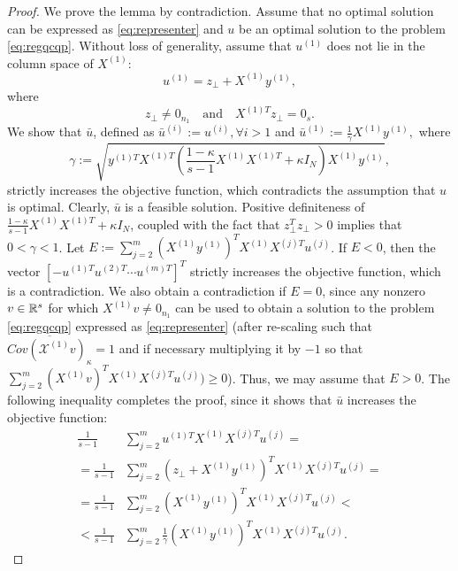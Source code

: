 \begin{proof}
We prove the lemma by contradiction. Assume that no optimal solution
can be expressed as \eqref{eq:representer} and $u$ be an optimal solution to the problem \eqref{eq:regqcqp}. Without loss of generality, assume that $u^{(1)}$ does not lie in the column space of $X^{(1)}$:
 $$u^{(1)} = z_{\bot} + X^{(1)} y^{(1)},$$
 where
$$z_{\bot} \neq 0_{n_1}\quad \text{and}\quad X^{(1)T}z_{\bot} = 0_s.$$
We show that $\bar{u}$, defined as $\bar{u}^{(i)} := u^{(i)}, \forall i> 1$ and $\bar{u}^{(1)} := \frac{1}{\gamma}  X^{(1)} y^{(1)},$ where
\begin{equation*}
\gamma :=\sqrt{ y^{(1)T} X^{(1)T} \left(\frac{1- \kappa}{s - 1}X^{(1)} X^{(1)T} + \kappa  I_N\right) X^{(1)} y^{(1)} },
\end{equation*}
strictly increases the objective function, which contradicts the assumption that $u$ is optimal. Clearly, $\bar{u}$ is a feasible solution. Positive definiteness of $\frac{1- \kappa}{s - 1}X^{(1)} X^{(1)T} + \kappa  I_N$, coupled with the fact that $z_{\bot}^T z_{\bot} > 0$ implies that $0 < \gamma < 1$. Let $E := \sum_{j = 2}^m \left(X^{(1)} y^{(1)}\right)^T X^{(1)}X^{(j)T} u^{(j)}$.
%
If $E < 0$, then the
vector $[-u^{(1)T} u^{(2)T} \cdots u^{(m)T}]^T$ strictly increases the
objective function, which is a contradiction. We also obtain a contradiction if $E = 0$, since any nonzero $v \in \mathbb{R}^{s}$ for which $X^{(1)}v \neq 0_{n_1}$ can be used to obtain a solution to the problem \eqref{eq:regqcqp} expressed as \eqref{eq:representer} (after re-scaling  such that $\overline{Cov\left(\mathcal{X}^{(1)}v\right)_\kappa} = 1$ and if necessary multiplying it by $-1$ so that $\sum_{j = 2}^m \left(X^{(1)} v\right)^T X^{(1)}X^{(j)T} u^{(j)}) \geq 0$).
Thus, we may assume that $E > 0$.
%
The following inequality completes the proof, since it shows that $\bar{u}$ increases the objective function:
\begin{align*}
  \frac{1}{s -1} & \sum_{j = 2}^m u^{(1)T} X^{(1)}X^{(j)T} u^{(j)} =\\
= \frac{1}{s -1} & \sum_{j = 2}^m \left(z_{\bot} + X^{(1)} y^{(1)}\right)^T X^{(1)}X^{(j)T} u^{(j)} = \\
= \frac{1}{s -1}  &\sum_{j = 2}^m \left(X^{(1)} y^{(1)}\right)^T X^{(1)}X^{(j)T} u^{(j)} < \\
< \frac{1}{s -1}  &\sum_{j = 2}^m \frac{1}{\gamma}\left(X^{(1)} y^{(1)}\right)^T X^{(1)}X^{(j)T} u^{(j)}.
\end{align*}
\end{proof}


